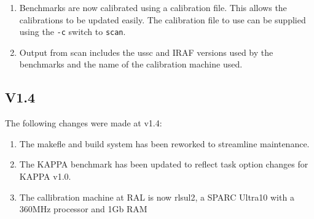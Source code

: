 \begin{enumerate}
\item Benchmarks are now calibrated using a calibration file. This
allows the calibrations to be updated easily. The calibration file to
use can be supplied using the {\tt -c} switch to {\tt scan}. 
\item Output from scan includes the ussc and IRAF versions used by the
benchmarks and the name of the calibration machine used.
\end{enumerate}

\subsection{V1.4}

The following changes were made at v1.4:

\begin{enumerate}
\item The makefle and build system has been reworked to streamline maintenance.
\item The KAPPA benchmark has been updated to reflect task option changes for KAPPA v1.0.
\item The callibration machine at RAL is now rlsul2, a SPARC Ultra10 with a 
360MHz processor and 1Gb RAM
\end{enumerate}


